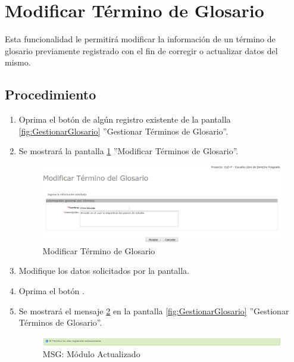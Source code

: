 \hypertarget{cv:modificarTermino}{\section{Modificar Término de Glosario}} \label{sec:modificarTermino}

	Esta funcionalidad le permitirá modificar la información de un término de glosario previamente registrado con el fin de corregir o actualizar datos del mismo. 

		\subsection{Procedimiento}

			\begin{enumerate}
	
			\item Oprima el botón \IUEditar{} de algún registro existente de la pantalla \ref{fig:GestionarGlosario} ''Gestionar Términos de Glosario''.
	
			\item Se mostrará la pantalla \ref{fig:modificarTermino} ''Modificar Términos de Glosario''.
			
			\begin{figure}[htbp!]
				\begin{center}
					\includegraphics[scale=0.5]{roles/lider/glosario/pantallas/IU6-2modificarTermino}
					\caption{Modificar Término de Glosario}
					\label{fig:modificarTermino}
				\end{center}
			\end{figure}
		
			\item Modifique los datos solicitados por la pantalla.
						
			\item Oprima el botón \IUAceptar.
			
			\item Se mostrará el mensaje \ref{fig:terminoModificado} en la pantalla \ref{fig:GestionarGlosario} ''Gestionar Términos de Glosario''.
			
			\begin{figure}[htbp!]
				\begin{center}
					\includegraphics[scale=0.5]{roles/lider/glosario/pantallas/IU6-2MSG1}
					\caption{MSG: Módulo Actualizado}
					\label{fig:terminoModificado}
				\end{center}
			\end{figure}
			\end{enumerate}